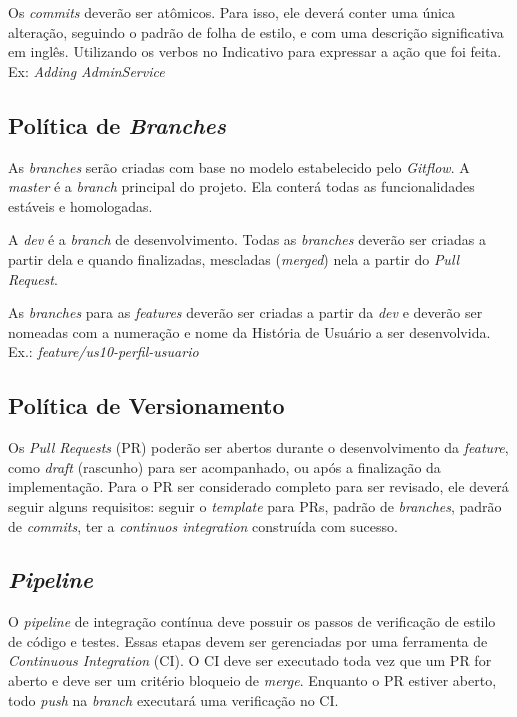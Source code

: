 \begin{apendicesenv}
Os \textit{commits} deverão ser atômicos. Para isso, ele deverá conter uma única alteração,
seguindo o padrão de folha de estilo, e com uma descrição significativa em inglês.
Utilizando os verbos no Indicativo para expressar a ação que foi feita. Ex: \textit{Adding AdminService}

\subsection*{Política de \textit{Branches}}

As \textit{branches} serão criadas com base no modelo estabelecido pelo \textit{Gitflow}.
A \textit{master} é a \textit{branch} principal do projeto. Ela conterá todas as funcionalidades estáveis e homologadas.

A \textit{dev} é a \textit{branch} de desenvolvimento. Todas as \textit{branches}  deverão ser criadas a partir dela e quando finalizadas, mescladas (\textit{merged}) nela a partir do \textit{Pull Request}.

As \textit{branches} para as \textit{features} deverão ser criadas a partir da \textit{dev} e deverão ser nomeadas com a numeração e nome da História de Usuário a ser desenvolvida. Ex.:
\textit{feature/us10-perfil-usuario}

\subsection*{Política de Versionamento}

Os \textit{Pull Requests} (PR) poderão ser abertos durante o desenvolvimento da \textit{feature},
como \textit{draft} (rascunho) para ser acompanhado, ou após a finalização da implementação.
Para o PR ser considerado completo para ser revisado, ele deverá seguir alguns requisitos: seguir o \textit{template} para PRs, padrão de \textit{branches}, padrão de \textit{commits}, ter a \textit{continuos integration} construída com sucesso.

\subsection*{\textit{Pipeline}}

O \textit{pipeline} de integração contínua deve possuir os passos de verificação de estilo de código e testes. Essas etapas devem ser gerenciadas por uma ferramenta de
\textit{Continuous Integration} (CI). O CI deve ser executado toda vez que um PR for aberto e deve ser um critério bloqueio de \textit{merge}. Enquanto o PR estiver aberto, todo \textit{push} na \textit{branch} executará uma verificação no CI.


\end{apendicesenv}
